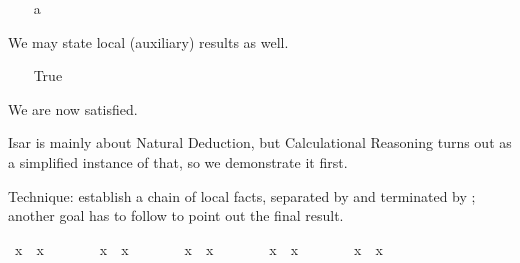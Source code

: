 \begin{isabellebody}
\isanewline
\ \ \isamarkupfalse%
\ a\ \ %
\isamarkupfalse%
%
\begin{isamarkuptxt}%
We may state local (auxiliary) results as well.%
\end{isamarkuptxt}%
\ \ \isamarkuptrue%
\ True\ \isamarkupfalse%
\ \isamarkupfalse%
\isamarkupfalse%
%
\begin{isamarkuptxt}%
We are now satisfied.%
\end{isamarkuptxt}%
\isamarkuptrue%
\isamarkupfalse%
%
\isamarkuptrue%
%
\begin{isamarkuptext}%
Isar is mainly about Natural Deduction, but Calculational Reasoning
  turns out as a simplified instance of that, so we demonstrate it
  first.%
\end{isamarkuptext}%
\isamarkuptrue%
%
\isamarkuptrue%
%
\begin{isamarkuptext}%
Technique: establish a chain of local facts, separated by 
  and terminated by ; another goal has to follow to point
  out the final result.%
\end{isamarkuptext}%
\isamarkuptrue%
\ {\isachardoublequote}x{}\ {\isacharequal}\ x{}{\isachardoublequote}\isanewline
\isamarkupfalse%
\ {\isacharminus}\ \ %
\isanewline
\ \ \isamarkupfalse%
\ {\isachardoublequote}x{}\ {\isacharequal}\ x{}{\isachardoublequote}\ \isamarkupfalse%
\isanewline
\ \ \isamarkupfalse%
\isanewline
\ \ \isamarkupfalse%
\ {\isachardoublequote}x{}\ {\isacharequal}\ x{}{\isachardoublequote}\ \isamarkupfalse%
\isanewline
\ \ \isamarkupfalse%
\isanewline
\ \ \isamarkupfalse%
\ {\isachardoublequote}x{}\ {\isacharequal}\ x{}{\isachardoublequote}\ \isamarkupfalse%
\isanewline
\ \ \isamarkupfalse%
\isanewline
\ \ \isamarkupfalse%
\ {\isachardoublequote}x{}\ {\isacharequal}\ x{}{\isachardoublequote}\ \isamarkupfalse%
\isacommand{{\isachardot}}\isanewline
\isamarkupfalse%
\isamarkupfalse%
%
\begin{isamarkuptext}%

\end{isamarkuptext}
\end{isabellebody}
